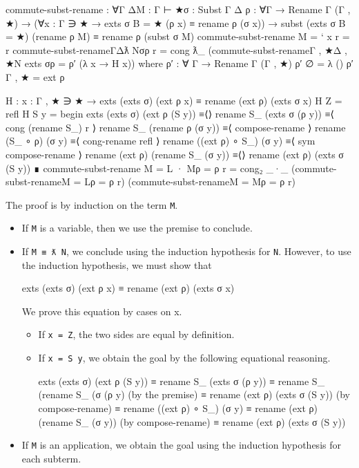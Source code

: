 \begin{fence}
\begin{code}
commute-subst-rename : ∀{Γ Δ}{M : Γ ⊢ ★}{σ : Subst Γ Δ}
                        {ρ : ∀{Γ} → Rename Γ (Γ , ★)}
     → (∀{x : Γ ∋ ★} → exts σ {B = ★} (ρ x) ≡ rename ρ (σ x))
     → subst (exts σ {B = ★}) (rename ρ M) ≡ rename ρ (subst σ M)
commute-subst-rename {M = ` x} r = r
commute-subst-rename{Γ}{Δ}{ƛ N}{σ}{ρ} r =
   cong ƛ_ (commute-subst-rename{Γ , ★}{Δ , ★}{N}
               {exts σ}{ρ = ρ′} (λ {x} → H {x}))
   where
   ρ′ : ∀ {Γ} → Rename Γ (Γ , ★)
   ρ′ {∅} = λ ()
   ρ′ {Γ , ★} = ext ρ

   H : {x : Γ , ★ ∋ ★} → exts (exts σ) (ext ρ x) ≡ rename (ext ρ) (exts σ x)
   H {Z} = refl
   H {S y} =
     begin
       exts (exts σ) (ext ρ (S y))
     ≡⟨⟩
       rename S_ (exts σ (ρ y))
     ≡⟨ cong (rename S_) r ⟩
       rename S_ (rename ρ (σ y))
     ≡⟨ compose-rename ⟩
       rename (S_ ∘ ρ) (σ y)
     ≡⟨ cong-rename refl ⟩
       rename ((ext ρ) ∘ S_) (σ y)
     ≡⟨ sym compose-rename ⟩
       rename (ext ρ) (rename S_ (σ y))
     ≡⟨⟩
       rename (ext ρ) (exts σ (S y))
     ∎
commute-subst-rename {M = L · M}{ρ = ρ} r =
   cong₂ _·_ (commute-subst-rename{M = L}{ρ = ρ} r)
             (commute-subst-rename{M = M}{ρ = ρ} r)
\end{code}
\end{fence}

The proof is by induction on the term \texttt{M}.

\begin{itemize}
\item
  If \texttt{M} is a variable, then we use the premise to conclude.
\item
  If \texttt{M\ ≡\ ƛ\ N}, we conclude using the induction hypothesis for
  \texttt{N}. However, to use the induction hypothesis, we must show
  that

  \begin{myDisplay}
    exts (exts σ) (ext ρ x) ≡ rename (ext ρ) (exts σ x)
  \end{myDisplay}

  We prove this equation by cases on x.

  \begin{itemize}
  \item
    If \texttt{x\ =\ Z}, the two sides are equal by definition.
  \item
    If \texttt{x\ =\ S\ y}, we obtain the goal by the following
    equational reasoning.

    \begin{myDisplay}
      exts (exts σ) (ext ρ (S y))
    ≡ rename S_ (exts σ (ρ y))
    ≡ rename S_ (rename S_ (σ (ρ y)      (by the premise)
    ≡ rename (ext ρ) (exts σ (S y))      (by compose-rename)
    ≡ rename ((ext ρ) ∘ S_) (σ y)
    ≡ rename (ext ρ) (rename S_ (σ y))   (by compose-rename)
    ≡ rename (ext ρ) (exts σ (S y))
    \end{myDisplay}
  \end{itemize}
\item
  If \texttt{M} is an application, we obtain the goal using the
  induction hypothesis for each subterm.
\end{itemize}

